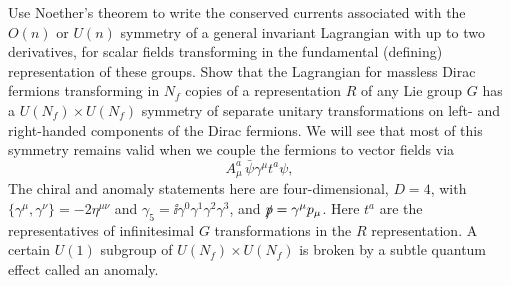 \begin{banksproblems}

Use Noether's theorem to write the conserved currents associated with the
$O(n)$ or $U(n)$ symmetry of a general invariant Lagrangian with up to two
derivatives, for scalar fields transforming in the fundamental (defining)
representation of these groups. Show that the Lagrangian for massless Dirac
fermions transforming in $N_f$ copies of a representation $R$ of any Lie group
$G$ has a $U(N_f)\times U(N_f)$ symmetry of separate unitary transformations on
left- and right-handed components of the Dirac fermions. We will see that most
of this symmetry remains valid when we couple the fermions to vector fields via
\begin{equation*}
  A_\mu^a\,\bar\psi\gamma^\mu t^a\psi,
\end{equation*}
The chiral and anomaly statements here are four-dimensional, $D=4$, with
$\{\gamma^\mu,\gamma^\nu\}=-2\eta^{\mu\nu}$ and
$\gamma_5=\ii\gamma^0\gamma^1\gamma^2\gamma^3$, and
$\slashed p=\gamma^\mu p_\mu$.  Here $t^a$ are the representatives of
infinitesimal $G$ transformations in
the $R$ representation. A certain $U(1)$ subgroup of
$U(N_f)\times U(N_f)$ is broken by a subtle quantum effect called an anomaly.


\end{banksproblems}
